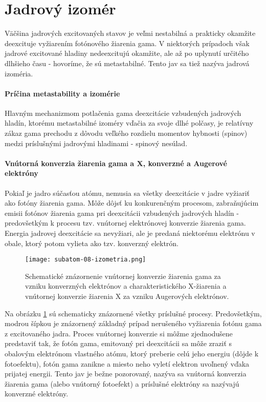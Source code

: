 \documentclass[../../main.tex]{subfiles}
\begin{document}
\section{Jadrový izomér}
Väčšina jadrových excitovaných stavov je veľmi nestabilná a prakticky okamžite deexcituje vyžiarením fotónového žiarenia gama. V niektorých prípadoch však jadrové excitované hladiny nedeexcitujú okamžite, ale až po uplynutí určitého dlhšieho času - hovoríme, že sú metastabilné. Tento jav sa tiež nazýva jadrová izoméria. 

\paragraph{Príčina metastability a izomérie} 
Hlavným mechanizmom potlačenia gama deexcitácie vzbudených jadrových hladín, ktorému metastabilné izoméry vďačia za svoje dlhé polčasy, je relatívny zákaz gama prechodu z dôvodu veľkého rozdielu momentov hybnosti (spinov) medzi príslušnými jadrovými hladinami - spinový nesúlad. 

\paragraph{Vnútorná konverzia žiarenia gama a X, konverzné a Augerové elektróny}
Pokiaľ je jadro súčasťou atómu, nemusia sa všetky deexcitácie v jadre vyžiariť ako fotóny žiarenia gama. Môže dôjsť ku konkurenčným procesom, zabraňujúcim emisii fotónov žiarenia gama pri deexcitácii vzbudených jadrových hladín - predovšetkým k procesu tzv. vnútornej elektrónovej konverzie žiarenia gama. Energia jadrovej deexcitácie sa nevyžiari, ale je predaná niektorému elektrónu v obale, ktorý potom vylieta ako tzv. konverzný elektrón.

\begin{figure}[!h]
\texttt{[image: subatom-08-izometria.png]}
\centering
\caption{Schematické znázornenie vnútornej konverzie žiarenia gama za vzniku konverzných elektrónov a charakteristického X-žiarenia a vnútornej konverzie žiarenia X za vzniku Augerových elektrónov.}
\label{sf8:fig:izometria}
\end{figure}

Na obrázku \ref{sf8:fig:izometria} sú schematicky znázornené všetky príslušné procesy. Predovšetkým, modrou šípkou je znázornený základný prípad nerušeného vyžiarenia fotónu gama z excitovaného jadra. Proces vnútornej konverzie si môžme zjednodušene predstaviť tak, že fotón gama, emitovaný pri deexcitácii sa môže zraziť s obalovým elektrónom vlastného atómu, ktorý preberie celú jeho energiu (dôjde k fotoefektu), fotón gama zanikne a miesto neho vyletí elektron uvoľnený vďaka prijatej energii. Tento jav je bežne pozorovaný, nazýva sa vnútorná konverzia žiarenia gama (alebo vnútorný fotoefekt) a príslušné elektróny sa nazývajú konverzné elektróny.
\end{document}
